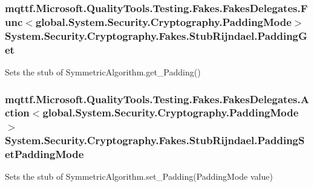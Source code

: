 \hypertarget{class_system_1_1_security_1_1_cryptography_1_1_fakes_1_1_stub_rijndael_a5caab082e9d9109465c98f6352506738}{
\subsubsection[{Padding\-Get}]{\setlength{\rightskip}{0pt plus 5cm}mqttf.\-Microsoft.\-Quality\-Tools.\-Testing.\-Fakes.\-Fakes\-Delegates.\-Func$<$global.\-System.\-Security.\-Cryptography.\-Padding\-Mode$>$ System.\-Security.\-Cryptography.\-Fakes.\-Stub\-Rijndael.\-Padding\-Get}}\label{class_system_1_1_security_1_1_cryptography_1_1_fakes_1_1_stub_rijndael_a5caab082e9d9109465c98f6352506738}


Sets the stub of Symmetric\-Algorithm.\-get\-\_\-\-Padding()

\hypertarget{class_system_1_1_security_1_1_cryptography_1_1_fakes_1_1_stub_rijndael_a3847ad560f59df0fe2fa5379b012b390}{
\subsubsection[{Padding\-Set\-Padding\-Mode}]{\setlength{\rightskip}{0pt plus 5cm}mqttf.\-Microsoft.\-Quality\-Tools.\-Testing.\-Fakes.\-Fakes\-Delegates.\-Action$<$global.\-System.\-Security.\-Cryptography.\-Padding\-Mode$>$ System.\-Security.\-Cryptography.\-Fakes.\-Stub\-Rijndael.\-Padding\-Set\-Padding\-Mode}}\label{class_system_1_1_security_1_1_cryptography_1_1_fakes_1_1_stub_rijndael_a3847ad560f59df0fe2fa5379b012b390}


Sets the stub of Symmetric\-Algorithm.\-set\-\_\-\-Padding(\-Padding\-Mode value)



